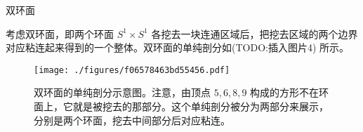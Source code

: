 \begin{example}{双环面}

考虑双环面，即两个环面 $S^1\times S^1$ 各挖去一块连通区域后，把挖去区域的两个边界对应粘连起来得到的一个整体。双环面的单纯剖分如(TODO:插入图片4) 所示。

\begin{figure}[ht]
\centering
\texttt{[image: ./figures/f06578463bd55456.pdf]}
\caption{双环面的单纯剖分示意图。注意，由顶点 $5, 6, 8, 9$ 构成的方形不在环面上，它就是被挖去的那部分。这个单纯剖分被分为两部分来展示，分别是两个环面，挖去中间部分后对应粘连。} \label{fig_SimCom_6}
\end{figure}


\end{example}
